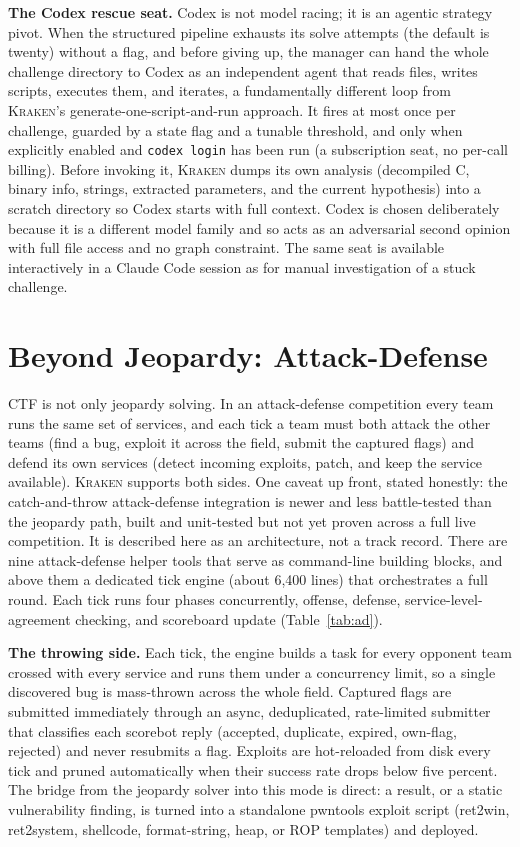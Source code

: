 \documentclass[10pt,twocolumn]{article}
\newcommand{\kraken}{\textsc{Kraken}}
\newcommand{\code}[1]{\seqsplit{\texttt{#1}}}
\begin{document}
\medskip
\textbf{The Codex rescue seat.} Codex is not model racing; it is an agentic strategy pivot. When the
structured pipeline exhausts its solve attempts (the default is twenty) without a flag, and before giving
up, the manager can hand the whole challenge directory to Codex as an independent agent that reads files,
writes scripts, executes them, and iterates, a fundamentally different loop from \kraken{}'s
generate-one-script-and-run approach. It fires at most once per challenge, guarded by a state flag and a
tunable threshold, and only when explicitly enabled and \texttt{codex login} has been run (a subscription
seat, no per-call billing). Before invoking it, \kraken{} dumps its own analysis (decompiled C, binary
info, strings, extracted parameters, and the current hypothesis) into a scratch directory so Codex starts
with full context. Codex is chosen deliberately because it is a different model family and so acts as an
adversarial second opinion with full file access and no graph constraint. The same seat is available
interactively in a Claude Code session as \code{codex:rescue} for manual investigation of a stuck challenge.

\section{Beyond Jeopardy: Attack-Defense}
\label{sec:ad}

CTF is not only jeopardy solving. In an attack-defense competition every team runs the same set of
services, and each tick a team must both attack the other teams (find a bug, exploit it across the field,
submit the captured flags) and defend its own services (detect incoming exploits, patch, and keep the
service available). \kraken{} supports both sides. One caveat up front, stated honestly: the catch-and-throw
attack-defense integration is newer and less battle-tested than the jeopardy path, built and unit-tested but
not yet proven across a full live competition. It is described here as an architecture, not a track record.
There are nine attack-defense
helper tools that serve as command-line building blocks, and above them a dedicated tick engine (about
6{,}400 lines) that orchestrates a full round. Each tick runs four phases concurrently, offense, defense,
service-level-agreement checking, and scoreboard update (Table~\ref{tab:ad}).

\medskip
\textbf{The throwing side.} Each tick, the engine builds a task for every opponent team crossed with every
service and runs them under a concurrency limit, so a single discovered bug is mass-thrown across the whole
field. Captured flags are submitted immediately through an async, deduplicated, rate-limited submitter that
classifies each scorebot reply (accepted, duplicate, expired, own-flag, rejected) and never resubmits a
flag. Exploits are hot-reloaded from disk every tick and pruned automatically when their success rate
drops below five percent. The bridge from the jeopardy solver into this mode is direct: a
\code{kraken\_full\_solve} result, or a static vulnerability finding, is turned into a standalone pwntools
exploit script (ret2win, ret2system, shellcode, format-string, heap, or ROP templates) and deployed.
\end{document}

